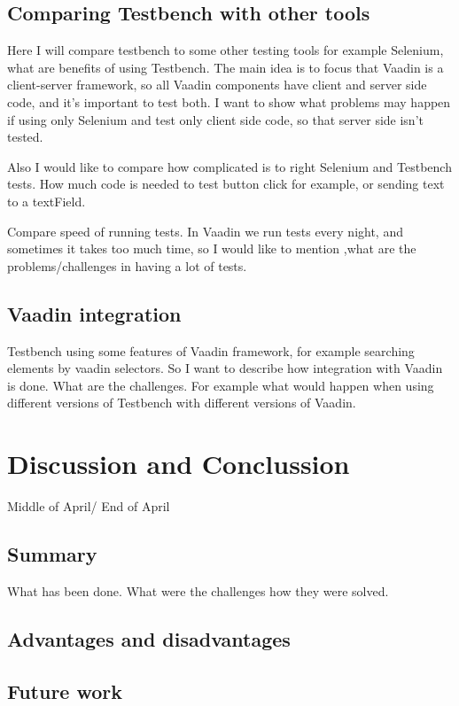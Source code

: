 \documentclass[12pt,a4paper,english%
]{tutthesis}
\begin{document}
 \subsection {Comparing Testbench with other tools}
    Here I will compare testbench to some other testing tools for example
    Selenium, what are benefits of using Testbench. The main idea is to focus
    that Vaadin is a client-server framework, so all Vaadin components have
    client and server side code, and it's important to test both. I want to show
    what problems may happen if using only Selenium and test only client side
    code, so that server side isn't tested. 
    
    Also I would like to compare how complicated is to right Selenium and
    Testbench tests. How much code is needed to test button click for example,
    or sending text to a textField.
    
    Compare speed of running tests. In Vaadin we run tests every night, and
    sometimes it takes too much time, so I would like to mention ,what are the
    problems/challenges in having a lot of tests.

      
 \subsection {Vaadin integration}
    Testbench using some features of Vaadin framework, for example searching
    elements by vaadin selectors. So I want to describe how integration with
    Vaadin is done. What are the challenges. For example what would happen when
    using different versions of Testbench with different versions of Vaadin.
\fi    

 \section {Discussion and Conclussion}
 	Middle of April/ End of April
 	\subsection {Summary}
 	  What has been done. What were the challenges how they were solved.
 	\subsection {Advantages and disadvantages}
 	\subsection {Future work}
 	\nocite{*}
 	
   
  
  
\end{document}
